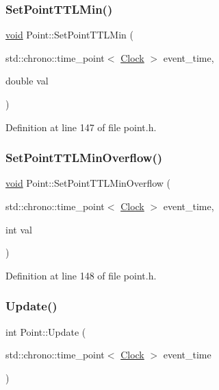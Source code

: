 \subsubsection{\texorpdfstring{Set\+Point\+T\+T\+L\+Min()}{SetPointTTLMin()}}
{\footnotesize\ttfamily \mbox{\hyperlink{glad_8h_a950fc91edb4504f62f1c577bf4727c29}{void}} Point\+::\+Set\+Point\+T\+T\+L\+Min (\begin{DoxyParamCaption}\item[{std\+::chrono\+::time\+\_\+point$<$ \mbox{\hyperlink{universe_8h_a0ef8d951d1ca5ab3cfaf7ab4c7a6fd80}{Clock}} $>$}]{event\+\_\+time,  }\item[{double}]{val }\end{DoxyParamCaption})\hspace{0.3cm}{\ttfamily [inline]}}



Definition at line 147 of file point.\+h.

\mbox{\label{class_point_a167884648fa6ce217472edfdbf515ac3}} 
\subsubsection{\texorpdfstring{Set\+Point\+T\+T\+L\+Min\+Overflow()}{SetPointTTLMinOverflow()}}
{\footnotesize\ttfamily \mbox{\hyperlink{glad_8h_a950fc91edb4504f62f1c577bf4727c29}{void}} Point\+::\+Set\+Point\+T\+T\+L\+Min\+Overflow (\begin{DoxyParamCaption}\item[{std\+::chrono\+::time\+\_\+point$<$ \mbox{\hyperlink{universe_8h_a0ef8d951d1ca5ab3cfaf7ab4c7a6fd80}{Clock}} $>$}]{event\+\_\+time,  }\item[{int}]{val }\end{DoxyParamCaption})\hspace{0.3cm}{\ttfamily [inline]}}



Definition at line 148 of file point.\+h.

\mbox{\label{class_point_a7ad2d1933410012c59bffbd4ac611279}} 
\subsubsection{\texorpdfstring{Update()}{Update()}}
{\footnotesize\ttfamily int Point\+::\+Update (\begin{DoxyParamCaption}\item[{std\+::chrono\+::time\+\_\+point$<$ \mbox{\hyperlink{universe_8h_a0ef8d951d1ca5ab3cfaf7ab4c7a6fd80}{Clock}} $>$}]{event\+\_\+time }\end{DoxyParamCaption})}



